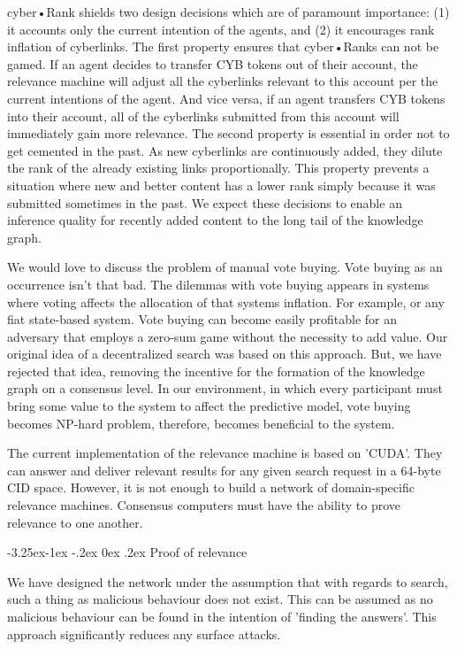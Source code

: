 \documentclass[8pt,oneside]{amsart}
\makeatletter
\newcommand{\linkgreen}[2]{\href{#1}{\color{green}{#2}}}
\renewcommand\subsection{\@startsection{subsection}{2}{\z@}%
                                     {-3.25ex\@plus -1ex \@minus -.2ex}%
                                     {0ex \@plus .2ex}%
                                     {\play\Large}}%
\newcommand{\titleSection}[1]{\subsection{#1}}
\makeatother
\begin{document}
\begin{Abstract}
cyber•Rank shields two design decisions which are of paramount importance: (1) it accounts only the current intention of the agents, and (2) it encourages rank inflation of cyberlinks. The first property ensures that cyber•Ranks can not be gamed. If an agent decides to transfer CYB tokens out of their account, the relevance machine will adjust all the cyberlinks relevant to this account per the current intentions of the agent. And vice versa, if an agent transfers CYB tokens into their account, all of the cyberlinks submitted from this account will immediately gain more relevance. The second property is essential in order not to get cemented in the past. As new cyberlinks are continuously added, they dilute the rank of the already existing links proportionally. This property prevents a situation where new and better content has a lower rank simply because it was submitted sometimes in the past. We expect these decisions to enable an inference quality for recently added content to the long tail of the knowledge graph.

We would love to discuss the problem of manual vote buying. Vote buying as an occurrence isn't that bad. The dilemmas with vote buying appears in systems where voting affects the allocation of that systems inflation. For example, \linkgreen{http://ipfs.io/ipfs/QmepU77tqMAHHuiSASUvUnu8f8ENuPF2Kfs97WjLn8vAS3}{Steem}
or any fiat state-based system. Vote buying can become easily profitable for an adversary that employs a zero-sum game without the necessity to add value. Our original idea of a decentralized search was based on this approach. But, we have rejected that idea, removing the incentive for the formation of the knowledge graph on a consensus level. In our environment, in which every participant must bring some value to the system to affect the predictive model, vote buying becomes NP-hard problem, therefore, becomes beneficial to the system.

The current implementation of the relevance machine is based on 'CUDA'. They can answer and deliver relevant results for any given search request in a 64-byte CID space. However, it is not enough to build a network of domain-specific relevance machines. Consensus computers must have the ability to prove relevance to one another.

\titleSection{Proof of relevance}\label{Proof of relevance}

We have designed the network under the assumption that with regards to search, such a thing as malicious behaviour does not exist. This can be assumed as no malicious behaviour can be found in the intention of 'finding the answers'. This approach significantly reduces any surface attacks.


\end{Abstract}
\end{document}
